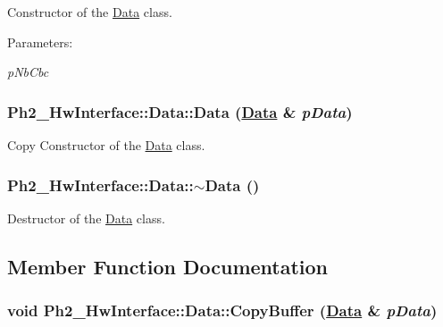 Constructor of the \hyperlink{class_ph2___hw_interface_1_1_data}{Data} class. 

\begin{Desc}
\item[Parameters:]
\begin{description}
\item[{\em p\-Nb\-Cbc}]\end{description}
\end{Desc}
\hypertarget{class_ph2___hw_interface_1_1_data_efcb0c450523abe1c4397189f64a3aff}{
\subsubsection[Data]{\setlength{\rightskip}{0pt plus 5cm}Ph2\_\-Hw\-Interface::Data::Data (\hyperlink{class_ph2___hw_interface_1_1_data}{Data} \& {\em p\-Data})}}
\label{class_ph2___hw_interface_1_1_data_efcb0c450523abe1c4397189f64a3aff}


Copy Constructor of the \hyperlink{class_ph2___hw_interface_1_1_data}{Data} class. 

\hypertarget{class_ph2___hw_interface_1_1_data_889228098e5c0b4eb5d06ad7850cdd7e}{
\subsubsection[$\sim$Data]{\setlength{\rightskip}{0pt plus 5cm}Ph2\_\-Hw\-Interface::Data::$\sim$Data ()}}
\label{class_ph2___hw_interface_1_1_data_889228098e5c0b4eb5d06ad7850cdd7e}


Destructor of the \hyperlink{class_ph2___hw_interface_1_1_data}{Data} class. 



\subsection{Member Function Documentation}
\hypertarget{class_ph2___hw_interface_1_1_data_751235bbc2393f58f9fd83b8837ad2b4}{
\subsubsection[CopyBuffer]{\setlength{\rightskip}{0pt plus 5cm}void Ph2\_\-Hw\-Interface::Data::Copy\-Buffer (\hyperlink{class_ph2___hw_interface_1_1_data}{Data} \& {\em p\-Data})}}
\label{class_ph2___hw_interface_1_1_data_751235bbc2393f58f9fd83b8837ad2b4}



